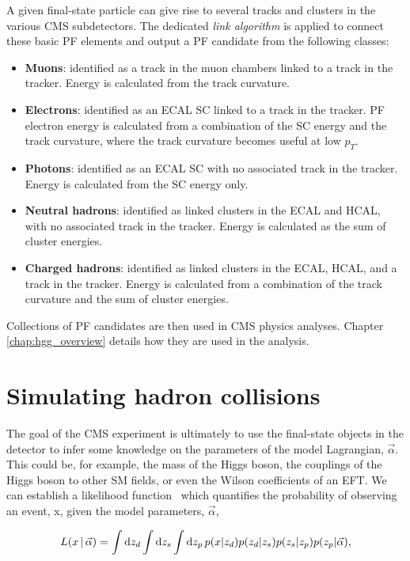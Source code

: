 A given final-state particle can give rise to several tracks and clusters in the various CMS subdetectors. The dedicated \textit{link algorithm} is applied to connect these basic PF elements and output a PF candidate from the following classes:
\begin{itemize}
    \item \textbf{Muons}: identified as a track in the muon chambers linked to a track in the tracker. Energy is calculated from the track curvature.
    \item \textbf{Electrons}: identified as an ECAL SC linked to a track in the tracker. PF electron energy is calculated from a combination of the SC energy and the track curvature, where the track curvature becomes useful at low $p_T$. 
    \item \textbf{Photons}: identified as an ECAL SC with no associated track in the tracker. Energy is calculated from the SC energy only.
    \item \textbf{Neutral hadrons}: identified as linked clusters in the ECAL and HCAL, with no associated track in the tracker. Energy is calculated as the sum of cluster energies.
    \item \textbf{Charged hadrons}: identified as linked clusters in the ECAL, HCAL, and a track in the tracker. Energy is calculated from a combination of the track curvature and the sum of cluster energies.
\end{itemize}
\noindent
Collections of PF candidates are then used in CMS physics analyses. Chapter \ref{chap:hgg_overview} details how they are used in the \Hgg analysis.

\section{Simulating hadron collisions}\label{sec:mc}
The goal of the CMS experiment is ultimately to use the final-state objects in the detector to infer some knowledge on the parameters of the model Lagrangian, $\vec{\alpha}$. This could be, for example, the mass of the Higgs boson, the couplings of the Higgs boson to other SM fields, or even the Wilson coefficients of an EFT. We can establish a likelihood function~\cite{Brehmer:2020cvb} which quantifies the probability of observing an event, x, given the model parameters, $\vec{\alpha}$,

\begin{equation}\label{eq:mc_integral}
    L(x\,|\,\vec{\alpha}) = \int {\rm{d}}z_d \int {\rm{d}}z_s \int {\rm{d}}z_p \, p(x|z_d)p(z_d|z_s)p(z_s|z_p)p(z_p|\vec{\alpha}),
\end{equation}

